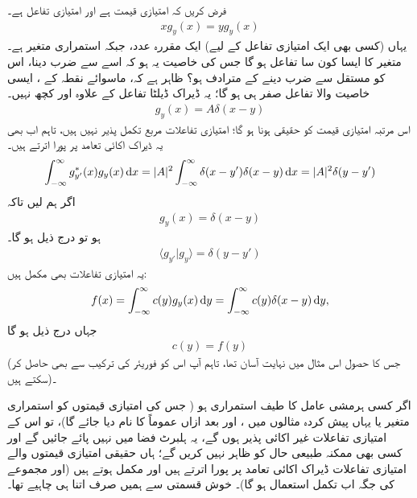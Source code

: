 فرض کریں کہ  امتیازی قیمت ہے  اور   امتیازی تفاعل ہے۔
\begin{align}
xg_{y}(x) = yg_{y}(x) 
\end{align}
یہاں (کسی بھی ایک امتیازی تفاعل کے لیے)  ایک مقررہ عدد، جبکہ  استمراری متغیر ہے۔متغیر  کا ایسا کون سا تفاعل ہو گا جس کی خاصیت یہ ہو کہ اسے  سے ضرب دینا، اس کو  مستقل  سے ضرب دینے کے مترادف ہو؟ ظاہر ہے کہ، ماسوائے نقطہ  کے ، ایسی خاصیت والا تفاعل صفر ہی ہو گا؛ یہ ڈیراک ڈیلٹا تفاعل کے علاوہ اور کچھ نہیں۔
\begin{align*}
g_{y}(x) = A\delta(x-y)
\end{align*}
اس مرتبہ امتیازی قیمت کو  حقیقی ہونا  ہو گا؛ امتیازی تفاعلات مربع تکمل پذیر نہیں ہیں، تاہم اب بھی یہ ڈیراک اکائی تعامد پر پورا اترتے ہیں۔
\begin{align}
\int_{-\infty}^{\infty}g_{y'}^{*}(x)g_{y}(x) \dif x = |A|^{2}\int_{-\infty}^{\infty}\delta(x-y')\delta(x-y) \dif x = |A|^{2} \delta (y-y')
\end{align}
اگر ہم  لیں تاکہ 
\begin{align}\label{مساوات_قواعد_ڈیراک_استعمال}
g_{y}(x) = \delta (x-y)
\end{align}
ہو تو  درج ذیل ہو گا۔
\begin{align}
\langle g_{y'} | g_{y} \rangle = \delta (y-y')
\end{align}
یہ امتیازی تفاعلات بھی مکمل ہیں:
\begin{align}
f(x) = \int_{-\infty}^{\infty} c(y)g_{y}(x) \dif y = \int_{-\infty}^{\infty} c(y)\delta(x-y)\dif y,
\end{align}
جہاں درج ذیل ہو گا
\begin{align}
c(y) = f(y)
\end{align}
(جس کا حصول اس مثال میں نہایت آسان تھا، تاہم آپ اس کو فوریئر کی ترکیب سے بھی حاصل کر سکتے ہیں)۔

اگر کسی ہرمشی عامل کا طیف استمراری ہو ( جس کی امتیازی قیمتوں  کو استمراری متغیر  یا یہاں پیش کردہ  مثالوں میں ، اور بعد ازاں عموماً  کا نام دیا جائے گا)، تو اس کے امتیازی تفاعلات  غیر اکائی پذیر  ہوں گے، یہ ہلبرٹ فضا میں نہیں پائے جائیں گے اور کسی بھی ممکنہ طبیعی حال کو ظاہر نہیں کریں گے؛ ہاں حقیقی امتیازی قیمتوں  والے امتیازی تفاعلات ڈیراک اکائی تعامد  پر پورا اترتے ہیں اور مکمل ہوتے ہیں (اور  مجموعے کی جگہ اب تکمل استعمال ہو گا)۔ خوش قسمتی سے ہمیں صرف اتنا ہی چاہیے تھا۔

